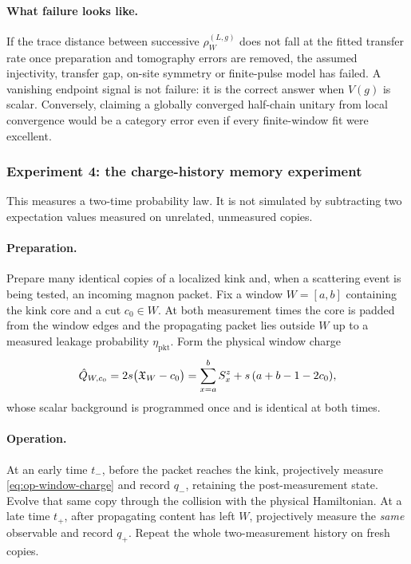 \paragraph{What failure looks like.} If the trace distance between successive
$\rho_W^{(L,g)}$ does not fall at the fitted transfer rate once preparation and
tomography errors are removed, the assumed injectivity, transfer gap, on-site
symmetry or finite-pulse model has failed. A vanishing endpoint signal is not
failure: it is the correct answer when $V(g)$ is scalar. Conversely, claiming a
globally converged half-chain unitary from local convergence would be a
category error even if every finite-window fit were excellent.

\subsubsection*{Experiment 4: the charge-history memory experiment}

This measures a two-time probability law. It is not simulated by subtracting
two expectation values measured on unrelated, unmeasured copies.

\paragraph{Preparation.} Prepare many identical copies of a localized kink
and, when a scattering event is being tested, an incoming magnon packet. Fix a
window $W=[a,b]$ containing the kink core and a cut $c_0\in W$. At both
measurement times the core is padded from the window edges and the propagating
packet lies outside $W$ up to a measured leakage probability
$\eta_{\mathrm{pkt}}$. Form the physical window charge
\begin{equation}
  \hat{Q}_{W,c_0}=2s\bigl(\mathfrak{X}_W-c_0\bigr)
  =\sum_{x=a}^{b}S^z_x+s\,(a+b-1-2c_0),
  \label{eq:op-window-charge}
\end{equation}
whose scalar background is programmed once and is identical at both times.

\paragraph{Operation.} At an early time $t_-$, before the packet reaches the
kink, projectively measure \eqref{eq:op-window-charge} and record $q_-$,
retaining the post-measurement state. Evolve that same copy through the
collision with the physical Hamiltonian. At a late time $t_+$, after
propagating content has left $W$, projectively measure the \emph{same}
observable and record $q_+$. Repeat the whole two-measurement history on fresh
copies.

